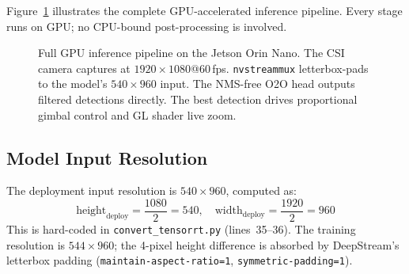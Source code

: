 \documentclass[12pt, titlepage]{article}
\begin{document}
Figure~\ref{fig:pipeline} illustrates the complete GPU-accelerated inference
pipeline. Every stage runs on GPU; no CPU-bound post-processing is involved.

\begin{figure}[H]
  \centering
  \caption{Full GPU inference pipeline on the Jetson Orin Nano.
    The CSI camera captures at $1920{\times}1080$@60\,fps.
    \texttt{nvstreammux} letterbox-pads to the model's
    $540{\times}960$ input.  The NMS-free O2O head outputs
    filtered detections directly.  The best detection drives
    proportional gimbal control and GL shader live zoom.}
  \label{fig:pipeline}
\end{figure}

\subsection{Model Input Resolution}
\label{sec:deploy_resolution}

The deployment input resolution is \textbf{$540{\times}960$}, computed as:
\[
  \text{height}_\text{deploy} = \frac{1080}{2} = 540, \quad
  \text{width}_\text{deploy} = \frac{1920}{2} = 960
\]
This is hard-coded in \texttt{convert\_tensorrt.py} (lines~35--36). The
training resolution is $544{\times}960$; the 4-pixel height difference is
absorbed by DeepStream's letterbox padding (\texttt{maintain-aspect-ratio=1},
\texttt{symmetric-padding=1}).
\end{document}
